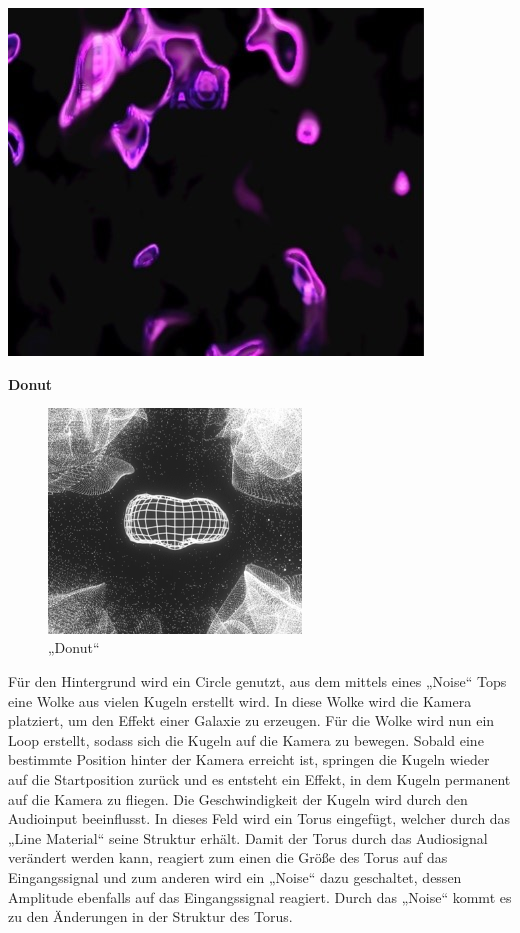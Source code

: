 \documentclass[12pt]{scrartcl}%
\theoremstyle{nonumberplain}
\begin{document}
\begin{minipage}{0.5\textwidth}
  \centering
  \includegraphics[width=\textwidth]{td_6}
\end{minipage}
\newpage
\noindent\textbf{Donut}
\begin{figure}
  \centering
  \includegraphics[width=0.6\textwidth]{td_5}
  \caption{„Donut“}
\end{figure}

\noindent Für den Hintergrund wird ein Circle genutzt, aus dem mittels eines „Noise“ Tops eine Wolke aus vielen Kugeln erstellt wird. In diese Wolke wird die Kamera platziert, um den Effekt einer Galaxie zu erzeugen. Für die Wolke wird nun ein Loop erstellt, sodass sich die Kugeln auf die Kamera zu bewegen. Sobald eine bestimmte Position hinter der Kamera erreicht ist, springen die Kugeln wieder auf die Startposition zurück und es entsteht ein Effekt, in dem Kugeln permanent auf die Kamera zu fliegen. Die Geschwindigkeit der Kugeln wird durch den Audioinput beeinflusst. In dieses Feld wird ein Torus eingefügt, welcher durch das „Line Material“ seine Struktur erhält. Damit der Torus durch das Audiosignal verändert werden kann, reagiert zum einen die Größe des Torus auf das Eingangssignal und zum anderen wird ein „Noise“ dazu geschaltet, dessen Amplitude ebenfalls auf das Eingangssignal reagiert. Durch das „Noise“ kommt es zu den Änderungen in der Struktur des Torus.
\end{document}
